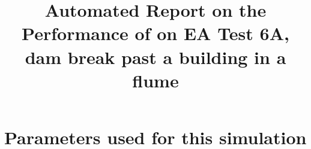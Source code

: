 \documentclass[11pt,a4paper]{article}%
\begin{document}
 

\title{Automated Report on the Performance of \anuga{} on EA Test 6A, dam break past a building in a flume}
\maketitle




\section{Parameters used for this simulation}






\end{document}
